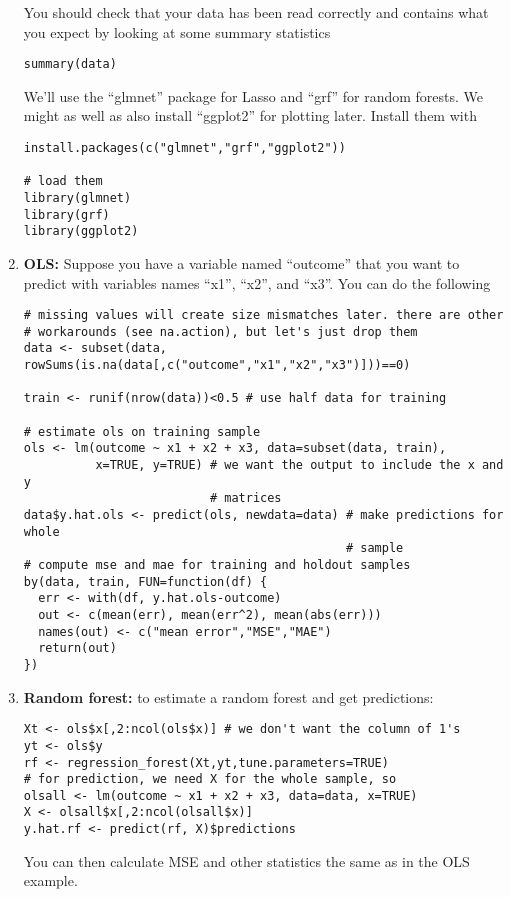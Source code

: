 \begin{problem}
\begin{enumerate}
    You should check that your data has been read correctly and contains
    what you expect by looking at some summary statistics
\begin{lstlisting}
summary(data)
\end{lstlisting}
    We'll use the ``glmnet'' package for Lasso and ``grf'' for random
    forests. We might as well as also install ``ggplot2'' for plotting
    later. Install them with
\begin{lstlisting}
install.packages(c("glmnet","grf","ggplot2")) 

# load them
library(glmnet)
library(grf)
library(ggplot2)
\end{lstlisting}

  \item \textbf{OLS:} Suppose you have a variable named ``outcome''
    that you want to predict with variables names ``x1'', ``x2'', and
    ``x3''. You can do the following   
\begin{lstlisting}
# missing values will create size mismatches later. there are other
# workarounds (see na.action), but let's just drop them 
data <- subset(data, rowSums(is.na(data[,c("outcome","x1","x2","x3")]))==0)

train <- runif(nrow(data))<0.5 # use half data for training

# estimate ols on training sample
ols <- lm(outcome ~ x1 + x2 + x3, data=subset(data, train),
          x=TRUE, y=TRUE) # we want the output to include the x and y
                          # matrices
data$y.hat.ols <- predict(ols, newdata=data) # make predictions for whole
                                             # sample
# compute mse and mae for training and holdout samples
by(data, train, FUN=function(df) {
  err <- with(df, y.hat.ols-outcome)
  out <- c(mean(err), mean(err^2), mean(abs(err)))
  names(out) <- c("mean error","MSE","MAE")
  return(out)
})
\end{lstlisting}
  \item \textbf{Random forest:} to estimate a random forest and get predictions:
\begin{lstlisting}
Xt <- ols$x[,2:ncol(ols$x)] # we don't want the column of 1's 
yt <- ols$y
rf <- regression_forest(Xt,yt,tune.parameters=TRUE)
# for prediction, we need X for the whole sample, so
olsall <- lm(outcome ~ x1 + x2 + x3, data=data, x=TRUE) 
X <- olsall$x[,2:ncol(olsall$x)]
y.hat.rf <- predict(rf, X)$predictions
\end{lstlisting}
    You can then calculate MSE and other statistics the same as in the
    OLS example.
    

\end{enumerate}
\end{problem}
